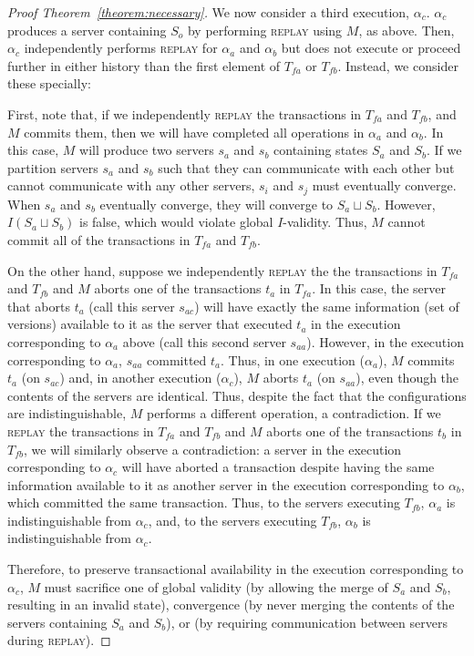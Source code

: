 \begin{proof}[Proof Theorem~\ref{theorem:necessary}]
  We now consider a third execution, $\alpha_c$. $\alpha_c$ produces a
  server containing $S_o$ by performing \textsc{replay} using $M$, as
  above. Then, $\alpha_c$ independently performs \textsc{replay}
  for $\alpha_a$ and $\alpha_b$ but does not execute or
  proceed further in either history than the first element of $T_{fa}$
  or $T_{fb}$. Instead, we consider these specially:

  First, note that, if we independently \textsc{replay} the
  transactions in $T_{fa}$ and $T_{fb}$, and $M$ commits them, then we
  will have completed all operations in $\alpha_a$ and $\alpha_b$. In
  this case, $M$ will produce two servers $s_a$ and $s_b$ containing
  states $S_a$ and $S_b$. If we partition servers $s_a$ and $s_b$ such
  that they can communicate with each other but cannot communicate
  with any other servers, $s_i$ and $s_j$ must eventually
  converge. When $s_a$ and $s_b$ eventually converge, they will
  converge to $S_a \sqcup S_b$. However, $I(S_a \sqcup S_b)$ is false,
  which would violate global $I$-validity. Thus, $M$ cannot commit all
  of the transactions in $T_{fa}$ and $T_{fb}$.

  On the other hand, suppose we independently \textsc{replay} the the
  transactions in $T_{fa}$ and $T_{fb}$ and $M$ aborts one of the
  transactions $t_a$ in $T_{fa}$. In this case, the server that aborts
  $t_a$ (call this server $s_{ac}$) will have exactly the same
  information (set of versions) available to it as the server that
  executed $t_a$ in the execution corresponding to $\alpha_a$ above
  (call this second server $s_{aa}$). However, in the execution
  corresponding to $\alpha_a$, $s_{aa}$ committed $t_a$. Thus, in one
  execution ($\alpha_a$), $M$ commits $t_{a}$ (on $s_{ac}$) and, in another
  execution ($\alpha_c$), $M$ aborts $t_{a}$ (on $s_{aa}$), even though the
  contents of the servers are identical. Thus, despite the fact that
  the configurations are indistinguishable, $M$ performs a different
  operation, a contradiction. If we \textsc{replay} the transactions
  in $T_{fa}$ and $T_{fb}$ and $M$ aborts one of the transactions
  $t_b$ in $T_{fb}$, we will similarly observe a contradiction: a
  server in the execution corresponding to $\alpha_c$ will have aborted a
  transaction despite having the same information available to it as
  another server in the execution corresponding to $\alpha_b$, which
  committed the same transaction. Thus, to the servers executing
  $T_{fb}$, $\alpha_a$ is indistinguishable from $\alpha_c$, and, to the
  servers executing $T_{fb}$, $\alpha_b$ is indistinguishable from $\alpha_c$.

  Therefore, to preserve transactional availability in the execution
  corresponding to $\alpha_c$, $M$ must sacrifice one of global
  validity (by allowing the merge of $S_a$ and $S_b$, resulting in an
  invalid state), convergence (by never merging the contents of the
  servers containing $S_a$ and $S_b$), or \cfreedom (by requiring
  communication between servers during \textsc{replay}).
\end{proof}

